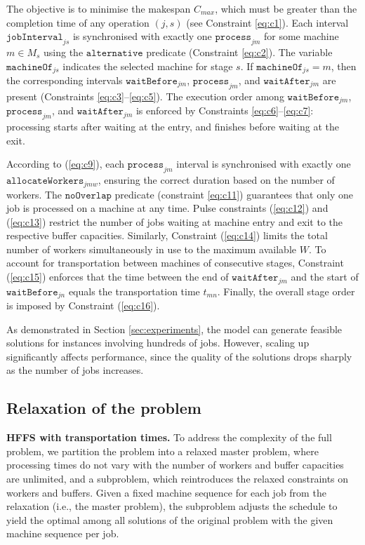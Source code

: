 \documentclass[a4paper,final]{article}
\begin{document}
    The objective is to minimise the makespan $C_{max}$, which must be greater than the completion time of any operation $(j, s)$ (see Constraint \ref{eq:c1}). Each interval $\texttt{jobInterval}_{js}$ is synchronised with exactly one $\texttt{process}_{jm}$ for some machine $m \in M_s$ using the $\texttt{alternative}$ predicate (Constraint \ref{eq:c2}). The variable $\texttt{machineOf}_{js}$ indicates the selected machine for stage $s$. If $\texttt{machineOf}_{js} = m$, then the corresponding intervals $\texttt{waitBefore}_{jm}$, $\texttt{process}_{jm}$, and $\texttt{waitAfter}_{jm}$ are present (Constraints \ref{eq:c3}–\ref{eq:c5}). The execution order among $\texttt{waitBefore}_{jm}$, $\texttt{process}_{jm}$, and $\texttt{waitAfter}_{jm}$ is enforced by Constraints \ref{eq:c6}–\ref{eq:c7}: processing starts after waiting at the entry, and finishes before waiting at the exit.

    According to (\ref{eq:c9}), each $\texttt{process}_{jm}$ interval is synchronised with exactly one $\texttt{allocateWorkers}_{jmw}$, ensuring the correct duration based on the number of workers. The $\texttt{noOverlap}$ predicate (constraint \ref{eq:c11}) guarantees that only one job is processed on a machine at any time. Pulse constraints (\ref{eq:c12}) and (\ref{eq:c13}) restrict the number of jobs waiting at machine entry and exit to the respective buffer capacities. Similarly, Constraint (\ref{eq:c14}) limits the total number of workers simultaneously in use to the maximum available $W$. To account for transportation between machines of consecutive stages, Constraint (\ref{eq:c15}) enforces that the time between the end of $\texttt{waitAfter}_{jm}$ and the start of $\texttt{waitBefore}_{jn}$ equals the transportation time $t_{mn}$. Finally, the overall stage order is imposed by Constraint (\ref{eq:c16}).
    
    As demonstrated in Section \ref{sec:experiments}, the model can generate feasible solutions for instances involving hundreds of jobs. However, scaling up significantly affects performance, since the quality of the solutions drops sharply as the number of jobs increases.

    \subsection{Relaxation of the problem} \label{sec:master}
\textbf{HFFS with transportation times. }To address the complexity of the full problem, we partition the problem into a relaxed master problem, where processing times do not vary with the number of workers and buffer capacities are unlimited, and a subproblem, which reintroduces the relaxed constraints on workers and buffers. Given a fixed machine sequence for each job from the relaxation (i.e., the master problem), the subproblem adjusts the schedule to yield the optimal among all solutions of the original problem with the given machine sequence per job.
\end{document}
